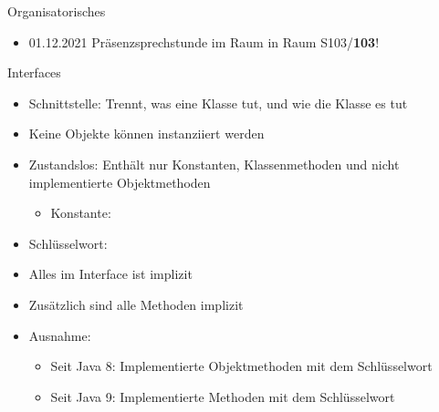 \documentclass{../tuda-beamer}
\date{24. November 2021}
\begin{document}
  \maketitle

  \begin{frame}{Organisatorisches}
    \begin{itemize}
      \item 01.12.2021 Präsenzsprechstunde im Raum in Raum S103/\textbf{103}!
    \end{itemize}
  \end{frame}

  \begin{frame}{Interfaces}
    \begin{itemize}
      \item Schnittstelle: Trennt, was eine Klasse tut, und wie die Klasse es tut
      \item Keine Objekte können instanziiert werden
      \item Zustandslos: Enthält nur Konstanten, Klassenmethoden und nicht implementierte
      Objektmethoden
      \begin{itemize}
        \item Konstante: 
      \end{itemize}
      \item Schlüsselwort: 
      \item Alles im Interface ist implizit 
      \item Zusätzlich sind alle Methoden implizit 
      \item Ausnahme:
      \begin{itemize}
        \item Seit Java 8: Implementierte Objektmethoden mit dem Schlüsselwort 
        \item Seit Java 9: Implementierte Methoden mit dem Schlüsselwort 
      \end{itemize}
    \end{itemize}
  \end{frame}
\end{document}
